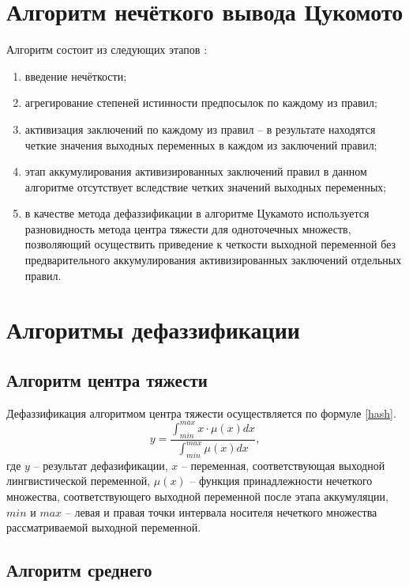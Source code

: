\documentclass[12pt]{report}
\begin{document}
\section{Алгоритм нечёткого вывода Цукомото}
Алгоритм состоит из следующих этапов \cite{bib:7}:
\begin{enumerate}
    \item введение нечёткости;
    \item агрегирование степеней истинности предпосылок по каждому из правил;
    \item активизация заключений по каждому из правил -- в результате находятся четкие значения выходных переменных в каждом из заключений правил;
    \item этап аккумулирования активизированных заключений правил в данном алгоритме отсутствует вследствие четких значений выходных переменных;
    \item в качестве метода дефаззификации в алгоритме Цукамото используется разновидность метода центра тяжести для одноточечных множеств, позволяющий осуществить приведение к четкости выходной переменной без предварительного аккумулирования активизированных заключений отдельных правил.
\end{enumerate}

\section{Алгоритмы дефаззификации}
\subsection{Алгоритм центра тяжести}

Дефаззификация алгоритмом центра тяжести осуществляется по формуле \ref{hash}.
\begin{equation}
	\label{hash}
	y = \frac{\int_{min}^{max} x \cdot \mu(x)dx}{\int_{min}^{max} \mu(x)dx},
\end{equation}
где $y$ -- результат дефазификации, $x$ -- переменная, соответствующая выходной лингвистической переменной, $\mu(x)$ -- функция принадлежности нечеткого множества, соответствующего выходной переменной после этапа аккумуляции, $min$ и $max$ -- левая и правая точки интервала носителя нечеткого множества рассматриваемой выходной переменной.

\subsection{Алгоритм среднего}
\end{document}
